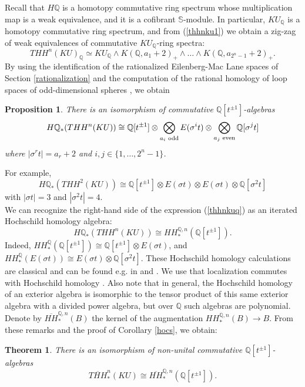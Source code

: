 \documentclass[a4paper,11pt]{amsart} %
\theoremstyle{definition} \newtheorem{defn}[equation]{Definition}
\theoremstyle{remark} \newtheorem{notation}[equation]{Notation}
\theoremstyle{plain} \newtheorem{teo}[equation]{Theorem}
\theoremstyle{plain} \newtheorem{lema}[equation]{Lemma}
\theoremstyle{plain} \newtheorem{prop}[equation]{Proposition}
\theoremstyle{plain} \newtheorem{corolario}[equation]{Corollary}
\theoremstyle{remark} \newtheorem{obs}[equation]{Remark}
\theoremstyle{remark} \newtheorem{sideobs}[equation]{Side remark}
\theoremstyle{remark} \newtheorem{ejercicio}[equation]{Exercise}
\theoremstyle{definition} \newtheorem{notn}[equation]{Notation}
\theoremstyle{remark} \newtheorem{ej}[equation]{Example}
\theoremstyle{remark} \newtheorem{contraej}[equation]{Counterexample}
\theoremstyle{plain} \newtheorem{conj}[equation]{Conjecture}
\renewcommand{\1}{\ensuremath{\mathbbm{1}}}
\newcommand{\Q}{\mathbb{Q}}
\renewcommand{\S}{\mathbb{S}}
\newcommand{\bprop}{\begin{prop}}
\newcommand{\eprop}{\end{prop}}
\newcommand{\bteo}{\begin{teo}}
\newcommand{\eteo}{\end{teo}}
\numberwithin{equation}{section}
\begin{document}
%
%
%
%
%
%
%
%
%
%
%
%
%
%
%
%
%
%
%
%
%
%
%
%
%
%
%
%
%
%
%
%
%
%
%
%
%
%
%
%
%
%
%
%
%
%
%
%
%
%
%
%
%
%


%
%

Recall that $H\Q$ is a homotopy commutative ring spectrum whose multiplication map is a weak equivalence, and it is a cofibrant $\S$-module. In particular, $KU_\Q$ is a homotopy  commutative ring spectrum, and from (\ref{thhnku1}) we obtain a zig-zag of weak equivalences of commutative $KU_\Q$-ring spectra:
\[THH^n(KU)_\Q \simeq KU_\Q \wedge K(\Q,a_1+2)_+ \wedge \dots \wedge K(\Q,a_{2^n-1}+2)_+.\]
By using the identification of the rationalized Eilenberg-Mac Lane spaces of Section \ref{rationalization} and the computation of the rational homology of loop spaces of odd-dimensional spheres \cite[Page 225]{fht-rational}, we obtain
\bprop There is an isomorphism of commutative $\Q[t^{\pm 1}]$-algebras
\begin{equation} \label{thhnkuq} H\Q_*(THH^n(KU)) \cong \Q[t^{\pm1}] \otimes \bigotimes_{a_i \textup{ odd}} E(\sigma^it) \otimes \bigotimes_{a_j \textup{ even}} \Q[\sigma^j t]  \end{equation} %
%
where $|\sigma^rt|=a_r+2$ and $i,j \in\{1,\dots, 2^n-1\}$. \eprop
For example,
\[H\Q_*(THH^2(KU)) \cong \Q[t^{\pm 1}] \otimes E(\sigma t) \otimes E(\sigma t)  \otimes \Q[\sigma^2t]\]
with $|\sigma t|=3$ and $|\sigma^2t|=4$.\\ %


We can recognize the right-hand side of the expression (\ref{thhnkuq}) as an iterated Hochschild homology algebra: 
\begin{equation} H\Q_*(THH^n(KU)) \cong HH^{\Q,n}_*(\Q[t^{\pm 1}]).\end{equation}
Indeed, $HH^\Q_*(\Q[t^{\pm1}])\cong \Q[t^{\pm 1}] \otimes E(\sigma t)$, and $HH^\Q_*(E(\sigma t))\cong E(\sigma t)\otimes \Q[\sigma^2t]$. These Hochschild homology calculations are classical and can be found e.g. in \cite[Section 2]{mc-st} and \cite[2.4]{angeltveit-rognes}. We use that localization commutes with Hochschild homology \cite[Theorem 9.1.8(3)]{weibel}. Also note that in general, the Hochschild homology of an exterior algebra is isomorphic to the tensor product of this same exterior algebra with a divided power algebra, but over $\Q$ such algebras are polynomial.\\

%
%
%
%
%
%
%
%

Denote by $\overline{HH}_*^{\Q,n}(B)$ the kernel of the augmentation $HH_*^{\Q,n}(B)\to B$. From these remarks and the proof of Corollary \ref{hocs}, we obtain:
\bteo  \label{high-hoch} There is an isomorphism of non-unital commutative $\Q[t^{\pm 1}]$-algebras
\[\overline{THH}^n_*(KU) \cong \overline{HH}_*^{\Q,n}(\Q[t^{\pm 1}]).\]
\eteo
%
\end{document}
